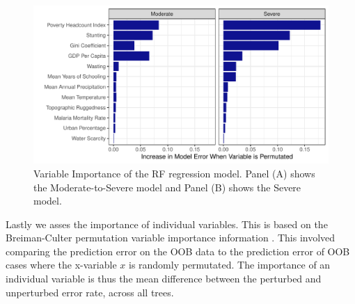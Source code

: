 \documentclass{article}
\begin{document}
\begin{figure}[H]
  \centering
  \includegraphics[width=\linewidth]{img/VIMP.pdf}
  \caption{Variable Importance of the RF regression model. Panel (A) shows the Moderate-to-Severe model and Panel (B) shows the Severe model.}
  \label{fig:rf_vimp}
\end{figure}

Lastly we asses the importance of individual variables. This is based on the Breiman-Culter permutation variable importance information \citep{breiman2001random}.  This involved comparing the prediction error on the OOB data to the prediction error of OOB cases where the x-variable $x$ is randomly permutated.  The importance of an individual variable is thus the mean difference between the perturbed and unperturbed error rate, across all trees. 
\end{document}
